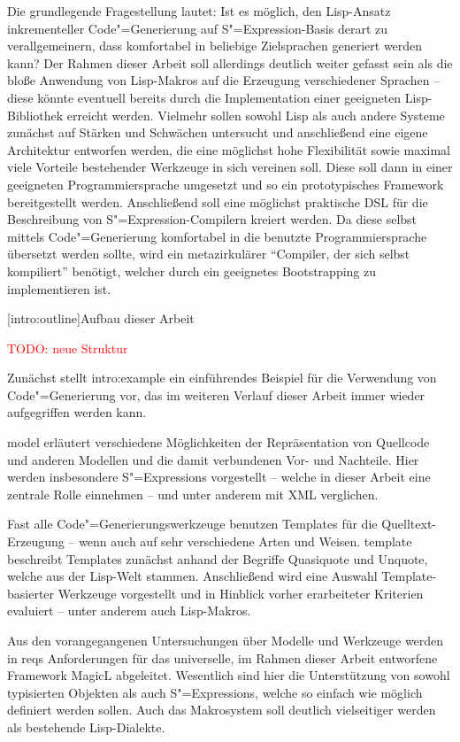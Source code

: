 \documentclass[12pt, a4paper, bibgerm]{scrbook}
\newcommand{\todo}[1]{
  \textcolor{red}{TODO: #1}
}
\newcommand\lsection{}
\newcommand\cref{}
\newcommand\sref{}
\newcommand{\sexp}{S"=Expression}
\newcommand{\sexps}{S"=Expressions}
\newcommand{\cgen}{Code"=Generierung}
\begin{document}
Die grundlegende Fragestellung lautet: Ist es möglich, den Lisp-Ansatz
inkrementeller \cgen{} auf \sexp{}-Basis derart zu verallgemeinern, dass
komfortabel in beliebige Zielsprachen generiert werden kann? Der Rahmen
dieser Arbeit soll allerdings deutlich weiter gefasst sein als die bloße
Anwendung von Lisp-Makros auf die Erzeugung verschiedener Sprachen --
diese könnte eventuell bereits durch die Implementation einer geeigneten
Lisp-Bibliothek erreicht werden. Vielmehr sollen sowohl Lisp als auch
andere Systeme zunächst auf Stärken und Schwächen untersucht und
anschließend eine eigene Architektur entworfen werden, die eine
möglichst hohe Flexibilität sowie maximal viele Vorteile bestehender
Werkzeuge in sich vereinen soll. Diese soll dann in einer geeigneten
Programmiersprache umgesetzt und so ein prototypisches Framework
bereitgestellt werden. Anschließend soll eine möglichst praktische DSL
für die Beschreibung von \sexp{}-Compilern kreiert werden. Da diese
selbst mittels \cgen{} komfortabel in die benutzte Programmiersprache
übersetzt werden sollte, wird ein metazirkulärer "`Compiler, der sich
selbst kompiliert"' benötigt, welcher durch ein geeignetes Bootstrapping
zu implementieren ist.

\lsection[intro:outline]{Aufbau dieser Arbeit}

\todo{neue Struktur}

Zunächst stellt \sref{intro:example} ein einführendes Beispiel für die
Verwendung von \cgen{} vor, das im weiteren Verlauf dieser Arbeit immer
wieder aufgegriffen werden kann.

\cref{model} erläutert verschiedene Möglichkeiten der Repräsentation von
Quellcode und anderen Modellen und die damit verbundenen Vor- und
Nachteile. Hier werden insbesondere \sexps{} vorgestellt -- welche in
dieser Arbeit eine zentrale Rolle einnehmen -- und unter anderem mit XML
verglichen.

Fast alle \cgen{}swerkzeuge benutzen Templates für die
Quelltext-Erzeugung -- wenn auch auf sehr verschiedene Arten und
Weisen. \cref{template} beschreibt Templates zunächst anhand der
Begriffe Quasiquote und Unquote, welche aus der Lisp-Welt
stammen. Anschließend wird eine Auswahl Template-basierter Werkzeuge
vorgestellt und in Hinblick vorher erarbeiteter Kriterien evaluiert --
unter anderem auch Lisp-Makros.

Aus den vorangegangenen Untersuchungen über Modelle und Werkzeuge werden
in \cref{reqs} Anforderungen für das universelle, im Rahmen dieser
Arbeit entworfene Framework MagicL abgeleitet. Wesentlich sind hier die
Unterstützung von sowohl typisierten Objekten als auch \sexps{}, welche
so einfach wie möglich definiert werden sollen. Auch das Makrosystem
soll deutlich vielseitiger werden als bestehende Lisp-Dialekte.
\end{document}
